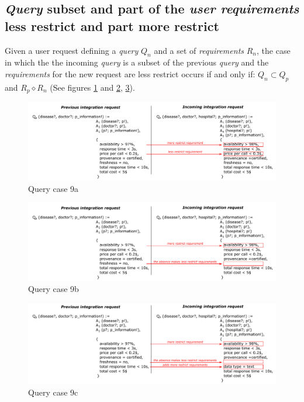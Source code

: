 \subsection{\textsl{Query} subset and part of the \textsl{user requirements} less restrict and part more restrict}
Given a user request defining a \textsl{query} $Q_{n}$ and a set of \textsl{requirements} $R_{n}$, the case in which the the incoming \textsl{query} is a subset of the previous \textsl{query} and the \textsl{requirements} for the new request are less restrict occurs if and only if: $Q_{n} \subset Q_{p}$ and $R_{p} \diamond R_{n}$ (See figures \ref{fig:case9a} and \ref{fig:case9b}, \ref{fig:case9c}).

\begin{figure}[h!]
\center
\includegraphics[scale=0.85]{figures/query-case-9a.pdf}\caption{Query case 9a} \label{fig:case9a}
\end{figure}

\begin{figure}[h!]
\center
\includegraphics[scale=0.85]{figures/query-case-9b.pdf}\caption{Query case 9b} \label{fig:case9b}
\end{figure}

\begin{figure}[h!]
\center
\includegraphics[scale=0.85]{figures/query-case-9c.pdf}\caption{Query case 9c} \label{fig:case9c}
\end{figure}

